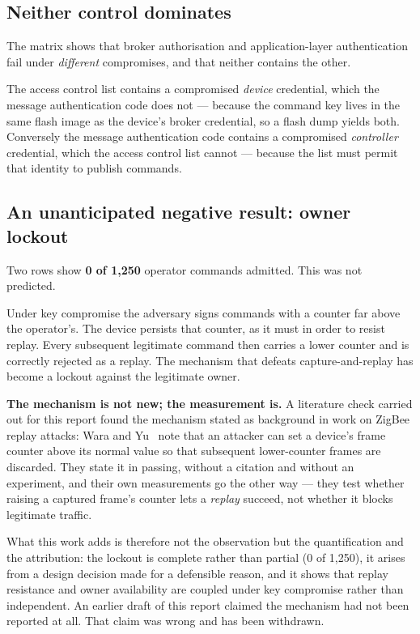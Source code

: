 \subsection{Neither control dominates}

The matrix shows that broker authorisation and application-layer authentication fail under
\emph{different} compromises, and that neither contains the other.

The access control list contains a compromised \emph{device} credential, which the message
authentication code does not — because the command key lives in the same flash image as the
device's broker credential, so a flash dump yields both. Conversely the message authentication
code contains a compromised \emph{controller} credential, which the access control list cannot
— because the list must permit that identity to publish commands.

\subsection{An unanticipated negative result: owner lockout}

Two rows show \textbf{0 of 1,250} operator commands admitted. This was not predicted.

Under key compromise the adversary signs commands with a counter far above the operator's. The
device persists that counter, as it must in order to resist replay. Every subsequent legitimate
command then carries a lower counter and is correctly rejected as a replay. The mechanism that
defeats capture-and-replay has become a lockout against the legitimate owner.

\textbf{The mechanism is not new; the measurement is.} A literature check carried out for this
report found the mechanism stated as background in work on ZigBee replay attacks: Wara and
Yu~\cite{wara2020} note that an attacker can set a device's frame counter above its normal value
so that subsequent lower-counter frames are discarded. They state it in passing, without a
citation and without an experiment, and their own measurements go the other way --- they test
whether raising a captured frame's counter lets a \emph{replay} succeed, not whether it blocks
legitimate traffic.

What this work adds is therefore not the observation but the quantification and the attribution:
the lockout is complete rather than partial (0 of 1,250), it arises from a design decision made
for a defensible reason, and it shows that replay resistance and owner availability are coupled
under key compromise rather than independent. An earlier draft of this report claimed the
mechanism had not been reported at all. That claim was wrong and has been withdrawn.

